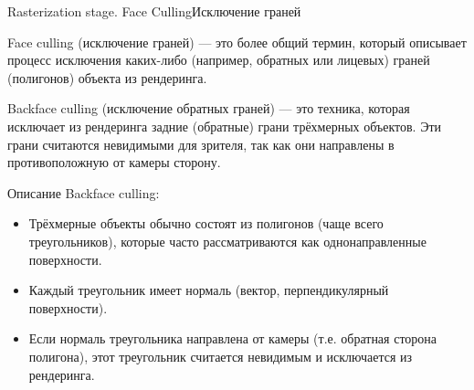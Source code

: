 \documentclass{beamer}
\begin{document}
	\begin{frame}{Rasterization stage. Face Culling}{Исключение граней}

		Face culling (исключение граней) --- это более общий термин, который описывает процесс исключения каких-либо (например, обратных или лицевых) граней (полигонов) объекта из рендеринга.
		
		Backface culling (исключение обратных граней) --- это техника, которая исключает из рендеринга задние (обратные) грани трёхмерных объектов. Эти грани считаются невидимыми для зрителя, так как они направлены в противоположную от камеры сторону.
	
		{ \footnotesize
		Описание Backface culling:
		\begin{itemize}
			\item 	
			Трёхмерные объекты обычно состоят из полигонов (чаще всего треугольников), которые часто рассматриваются как однонаправленные поверхности.
			\item 
			Каждый треугольник имеет нормаль (вектор, перпендикулярный поверхности).
			\item 
			Если нормаль треугольника направлена от камеры (т.е. обратная сторона полигона), этот треугольник считается невидимым и исключается из рендеринга.
		\end{itemize}

		
		}


	\end{frame}
\end{document}
